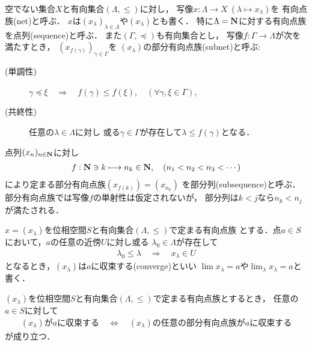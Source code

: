 	\begin{screen}
		\begin{dfn}[有向点族]
			空でない集合$X$と有向集合$(\Lambda,\leq)$に対し，
			写像$x:\Lambda \longrightarrow X\ (\lambda \longmapsto x_\lambda)$を
			有向点族(net)と呼ぶ．
			$x$は$(x_\lambda)_{\lambda \in \Lambda}$や$(x_\lambda)$とも書く．
			特に$\Lambda=\mathbf{N}$に対する有向点族を点列(sequence)と呼ぶ．
			また$(\Gamma,\preceq)$も有向集合とし，
			写像$f:\Gamma \longrightarrow \Lambda$が次を満たすとき，
			$\left(x_{f(\gamma)}\right)_{\gamma \in \Gamma}$を
			$(x_\lambda)$の部分有向点族(subnet)と呼ぶ:
			\begin{description}
				\item[(単調性)] $\gamma \preceq \xi \quad \Longrightarrow \quad
					f(\gamma) \leq f(\xi),\quad (\forall \gamma,\xi \in \Gamma)$,
				\item[(共終性)] 任意の$\lambda \in \Lambda$に対し
					或る$\gamma \in \Gamma$が存在して$\lambda \leq f(\gamma)$となる．
			\end{description}
		\end{dfn}
	\end{screen}
	点列$(x_n)_{n \in \mathbf{N}}$に対し
	\begin{align}
		f:\mathbf{N} \ni k \longmapsto n_k \in \mathbf{N},
		\quad (n_1 < n_2 < n_3 < \cdots)
	\end{align}
	により定まる部分有向点族$\left(x_{f(k)}\right)=\left(x_{n_k}\right)$
	を部分列(subsequence)と呼ぶ．
	部分有向点族では写像$f$の単射性は仮定されないが，
	部分列は$k < j$なら$n_k < n_j$が満たされる．
	
	
	\begin{screen}
		\begin{dfn}
			$x = (x_\lambda)$を位相空間$S$と有向集合$(\Lambda,\leq)$で定まる有向点族
			とする．点$a \in S$において，$a$の任意の近傍$U$に対し或る
			$\lambda_0 \in \Lambda$が存在して
			\begin{align}
				\lambda_0 \leq \lambda \quad \Longrightarrow \quad
				x_\lambda \in U
			\end{align}
			となるとき，$(x_\lambda)$は$a$に収束する(converge)といい
			$\lim x_\lambda = a$や$\lim_{\lambda} x_\lambda = a$と書く．
		\end{dfn}
	\end{screen}
	
	\begin{screen}
		\begin{thm}
		\label{thm:a_net_converges_iff_every_subnet_converges}
			$(x_\lambda)$を位相空間$S$と有向集合$(\Lambda,\leq)$で定まる有向点族とするとき，
			任意の$a \in S$に対して
			\begin{align}
				\mbox{$(x_\lambda)$が$a$に収束する}
				\quad \Longleftrightarrow \quad
				\mbox{$(x_\lambda)$の任意の部分有向点族が$a$に収束する}
			\end{align}
			が成り立つ．
		\end{thm}
	\end{screen}
	
